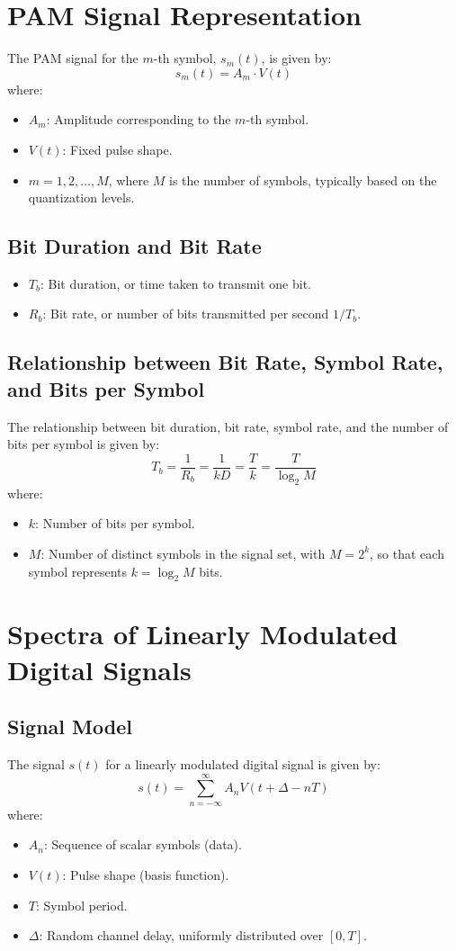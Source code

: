 \documentclass[10pt]{article}
\begin{document}
\section{PAM Signal Representation}
The PAM signal for the \( m \)-th symbol, \( s_m(t) \), is given by:
\[
s_m(t) = A_m \cdot V(t)
\]
where:
\begin{itemize}
    \item \( A_m \): Amplitude corresponding to the \( m \)-th symbol.
    \item \( V(t) \): Fixed pulse shape.
    \item \( m = 1, 2, \dots, M \), where \( M \) is the number of symbols, typically based on the quantization levels.
\end{itemize}

\subsection{Bit Duration and Bit Rate}
\begin{itemize}
    \item \( T_b \): Bit duration, or time taken to transmit one bit.
    \item \( R_b \): Bit rate, or number of bits transmitted per second $1/T_b$.
\end{itemize}

\subsection{Relationship between Bit Rate, Symbol Rate, and Bits per Symbol}
The relationship between bit duration, bit rate, symbol rate, and the number of bits per symbol is given by:
\[
T_b = \frac{1}{R_b} = \frac{1}{kD} = \frac{T}{k} = \frac{T}{\log_2 M}
\]
where:
\begin{itemize}
    \item \( k \): Number of bits per symbol.
    \item \( M \): Number of distinct symbols in the signal set, with \( M = 2^k \), so that each symbol represents \( k = \log_2 M \) bits.
\end{itemize}

\section{Spectra of Linearly Modulated Digital Signals}

\subsection{Signal Model}
The signal \( s(t) \) for a linearly modulated digital signal is given by:
\[
s(t) = \sum_{n=-\infty}^{\infty} A_n V(t + \Delta - nT)
\]
where:
\begin{itemize}
    \item \( A_n \): Sequence of scalar symbols (data).
    \item \( V(t) \): Pulse shape (basis function).
    \item \( T \): Symbol period.
    \item \( \Delta \): Random channel delay, uniformly distributed over \( [0, T] \).
\end{itemize}
\end{document}

